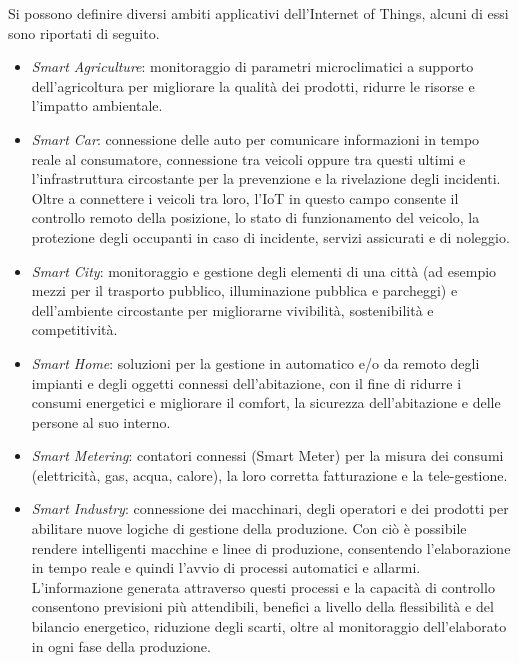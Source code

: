\noindent Si possono definire diversi ambiti applicativi dell'Internet of Things, alcuni di essi sono riportati di seguito.
\begin{itemize}
    \item \textit{Smart Agriculture}: monitoraggio di parametri microclimatici a supporto dell'agricoltura per migliorare la qualità dei prodotti, ridurre le risorse e l'impatto ambientale.
    
    \item \textit{Smart Car}: connessione delle auto per comunicare informazioni in tempo reale al consumatore, connessione tra veicoli oppure tra questi ultimi e l'infrastruttura circostante per la prevenzione e la rivelazione degli incidenti. Oltre a connettere i veicoli tra loro, l'IoT in questo campo consente il controllo remoto della posizione, lo stato di funzionamento del veicolo, la protezione degli occupanti in caso di incidente, servizi assicurati e di noleggio.
    
    \item \textit{Smart City}: monitoraggio e gestione degli elementi di una città (ad esempio mezzi per il trasporto pubblico, illuminazione pubblica e parcheggi) e dell’ambiente circostante per migliorarne vivibilità, sostenibilità e competitività.
    
    \item \textit{Smart Home}: soluzioni per la gestione in automatico e/o da remoto degli impianti e degli oggetti connessi dell’abitazione, con il fine di ridurre i consumi energetici e migliorare il comfort, la sicurezza dell’abitazione e delle persone al suo interno.
    
    \item \textit{Smart Metering}: contatori connessi (Smart Meter) per la misura dei consumi (elettricità, gas, acqua, calore), la loro corretta fatturazione e la tele-gestione.
    
    \item \textit{Smart Industry}: connessione dei macchinari, degli operatori e dei prodotti per abilitare nuove logiche di gestione della produzione. Con ciò è possibile rendere intelligenti macchine e linee di produzione, consentendo l'elaborazione in tempo reale e quindi l'avvio di processi automatici e allarmi. L'informazione generata attraverso questi processi e la capacità di controllo consentono previsioni più attendibili, benefici a livello della flessibilità e del bilancio energetico, riduzione degli scarti, oltre al monitoraggio dell'elaborato in ogni fase della produzione.
\end{itemize}


